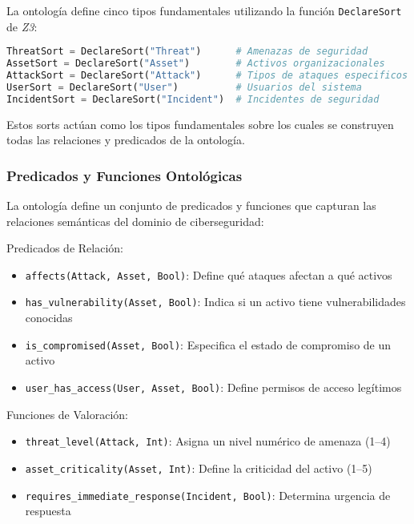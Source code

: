 La ontología define cinco tipos fundamentales utilizando la función \verb|DeclareSort| de \textit{Z3}:

\begin{lstlisting}[language=python, caption={Definición de Tipos Básicos en Z3}, label={lst:sorts}]
ThreatSort = DeclareSort("Threat")      # Amenazas de seguridad
AssetSort = DeclareSort("Asset")        # Activos organizacionales
AttackSort = DeclareSort("Attack")      # Tipos de ataques especificos
UserSort = DeclareSort("User")          # Usuarios del sistema
IncidentSort = DeclareSort("Incident")  # Incidentes de seguridad
\end{lstlisting}

Estos sorts actúan como los tipos fundamentales sobre los cuales se construyen todas las relaciones y predicados de la ontología.

\subsubsection{Predicados y Funciones Ontológicas}

La ontología define un conjunto de predicados y funciones que capturan las relaciones semánticas del dominio de ciberseguridad:

\noindent Predicados de Relación:

\begin{itemize}
    \item \verb|affects(Attack, Asset, Bool)|: Define qué ataques afectan a qué activos
    \item \verb|has_vulnerability(Asset, Bool)|: Indica si un activo tiene vulnerabilidades conocidas
    \item \verb|is_compromised(Asset, Bool)|: Especifica el estado de compromiso de un activo
    \item \verb|user_has_access(User, Asset, Bool)|: Define permisos de acceso legítimos
\end{itemize}

\noindent Funciones de Valoración:

\begin{itemize}
    \item \verb|threat_level(Attack, Int)|: Asigna un nivel numérico de amenaza (1--4)
    \item \verb|asset_criticality(Asset, Int)|: Define la criticidad del activo (1--5)
    \item \verb|requires_immediate_response(Incident, Bool)|: Determina urgencia de respuesta
\end{itemize}

